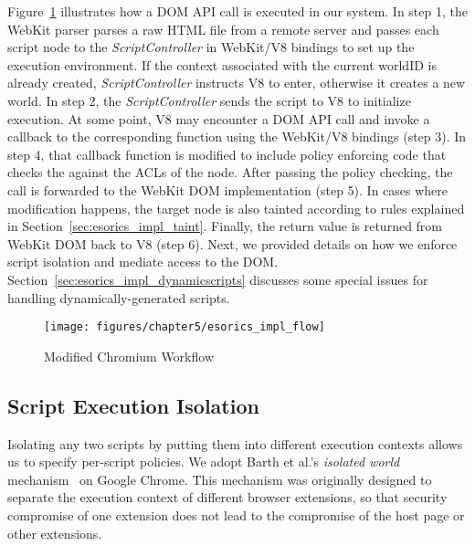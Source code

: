 Figure~\ref{fig:esorics_impl_flow} illustrates how a DOM API call is executed in our system.  In step 1, the WebKit parser parses a raw HTML file from a remote server and passes each script node to the \emph{ScriptController} in WebKit/V8 bindings to set up the execution environment.  If the context associated with the current worldID is already created,  \emph{ScriptController} instructs V8 to enter, otherwise it creates a new world.  In step 2, the \emph{ScriptController} sends the script to V8 to initialize execution.  At some point, V8 may encounter a DOM API call and invoke a callback to the corresponding function using the WebKit/V8 bindings (step 3).  In step 4, that callback function is modified to include policy enforcing code that checks the  against the ACLs of the node.  After passing the policy checking, the call is forwarded to the WebKit DOM implementation (step 5).  In cases where modification happens, the target node is also tainted according to rules explained in Section~\ref{sec:esorics_impl_taint}.  Finally, the return value is returned from WebKit DOM back to V8 (step 6).  Next, we provided details on how we enforce script isolation and mediate access to the DOM.  Section~\ref{sec:esorics_impl_dynamicscripts} discusses some special issues for handling dynamically-generated scripts.

\begin{figure}[hbt]
\centering
\texttt{[image: figures/chapter5/esorics\_impl\_flow]}
\caption{Modified Chromium Workflow}
\label{fig:esorics_impl_flow}
\end{figure}

\subsection{Script Execution Isolation} 

Isolating any two scripts by putting them into different execution contexts allows us to specify per-script policies.  We adopt Barth et al.'s \emph{isolated world} mechanism~\cite{extension} on Google Chrome.  This mechanism was originally designed to separate the execution context of different browser extensions, so that security compromise of one extension does not lead to the compromise of the host page or other extensions.  

